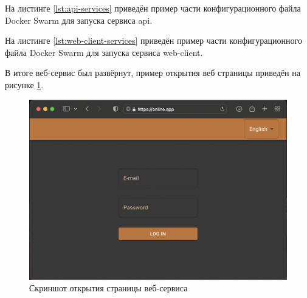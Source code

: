 На листинге \ref{lst:api-services} приведён пример части конфигурационного файла Docker Swarm для запуска сервиса api.



На листинге \ref{lst:web-client-services} приведён пример части конфигурационного файла Docker Swarm для запуска сервиса web-client.



В итоге веб-сервис был развёрнут, пример открытия веб страницы приведён на рисунке \ref{fig:app-screen}.

\begin{figure}[ht]
    \centering
    \includegraphics[scale=0.4]{src/figures/app-screen}
    \caption{Скриншот открытия страницы веб-сервиса}
    \label{fig:app-screen}
\end{figure}

